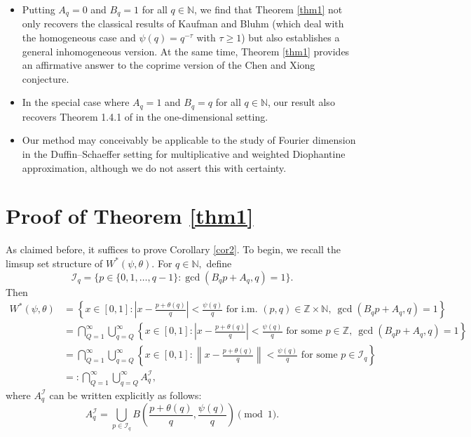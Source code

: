 \documentclass[12pt,a4paper,twoside]{article}
\begin{document}
\begin{itemize}
\item Putting \(A_q = 0\) and \(B_q = 1\) for all \(q \in \mathbb{N}\), we find that Theorem \ref{thm1} not only recovers the classical results of Kaufman and Bluhm (which deal with the homogeneous case and \(\psi(q) = q^{-\tau}\) with \(\tau \ge 1\)) but also establishes a general inhomogeneous version. At the same time, Theorem \ref{thm1} provides an affirmative answer to the coprime version of the Chen and Xiong conjecture.



\item  In the special case where \(A_q = 1\) and \(B_q = q\) for all \(q \in \mathbb{N}\), our result also recovers Theorem 1.4.1 of \cite{CH24} in the one-dimensional setting.






\item Our method may conceivably be applicable to the study of  Fourier dimension in the Duffin–Schaeffer setting for multiplicative and weighted Diophantine approximation, although we do not assert this with certainty.

\end{itemize}



\section{Proof of Theorem \ref{thm1}}

As claimed before, it suffices to prove Corollary \ref{cor2}.
To begin, we recall the limsup set structure of \(W^{\ast}(\psi,\theta)\). For $q\in\mathbb{N},$ define
\begin{equation}\label{I_q}
  \mathcal{I}_q=\Big\{p\in\{0,1,\ldots,q-1\}\colon \gcd(B_qp+A_q,q)=1\Big\}.
\end{equation}
Then
\begin{align*}
W^{\ast}(\psi,\theta)
&=\left\{x\in[0,1]\colon \left|x-\frac{p+\theta(q)}{q}\right|<\frac{\psi(q)}{q} \text{ for i.m. } (p,q)\in \mathbb{Z}\times \mathbb{N},~ \gcd(B_qp+A_q,q)=1\right\}\\
&=\bigcap_{Q=1}^{\infty}\bigcup_{q=Q}^{\infty}\left\{x\in[0,1]\colon \left|x-\frac{p+\theta(q)}{q}\right|<\frac{\psi(q)}{q} \text{ for some } p\in \mathbb{Z},~\gcd(B_qp+A_q,q)=1\right\}\\
&=\bigcap_{Q=1}^{\infty}\bigcup_{q=Q}^{\infty}\left\{x\in[0,1]\colon \left\|x-\frac{p+\theta(q)}{q}\right\|<\frac{\psi(q)}{q} \text{ for some } p\in \mathcal{I}_q\right\}\\
&=:\bigcap_{Q=1}^{\infty}\bigcup_{q=Q}^{\infty}A_q^{\mathcal{I}},    \end{align*}
where \(A_q^{\mathcal{I}}\) can be written explicitly as follows:
\begin{equation}\label{IU}
 A_q^{\mathcal{I}}=\bigcup_{p\in \mathcal{I}_q}B\left(\frac{p+\theta(q)}{q},\frac{\psi(q)}{q}\right) \pmod{1}.
\end{equation}
\end{document}
